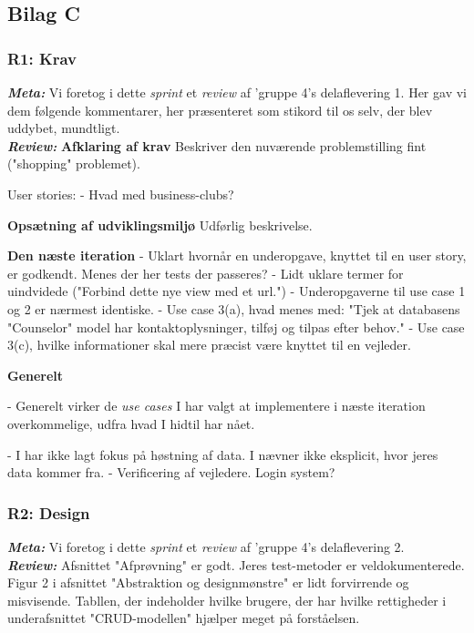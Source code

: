 \documentclass[12pt]{article}
\begin{document}
\subsection{Bilag C}
\label{sec:bilagC}
\subsubsection{R1: Krav}
\textit{\textbf{Meta:}} Vi foretog i dette \textit{sprint} et \textit{review} af 'gruppe 4's delaflevering 1. Her gav vi dem følgende kommentarer, her præsenteret som stikord til os selv, der blev uddybet, mundtligt. \\

\textit{\textbf{Review:}} \textbf{Afklaring af krav}
Beskriver den nuværende problemstilling fint ("shopping" problemet).

User stories:
- Hvad med business-clubs?

\textbf{Opsætning af udviklingsmiljø}
Udførlig beskrivelse.

\textbf{Den næste iteration}
- Uklart hvornår en underopgave, knyttet til en user story, er godkendt. Menes der her tests der passeres?
- Lidt uklare termer for uindvidede ("Forbind dette nye view med et url.")
- Underopgaverne til use case 1 og 2 er nærmest identiske.
- Use case 3(a), hvad menes med: "Tjek at databasens "Counselor" model har kontaktoplysninger, tilføj og tilpas efter behov."
- Use case 3(c), hvilke informationer skal mere præcist være knyttet til en vejleder.

\textbf{Generelt}

- Generelt virker de \textit{use cases} I har valgt at implementere i næste iteration overkommelige, udfra hvad I hidtil har nået.

- I har ikke lagt fokus på høstning af data. I nævner ikke eksplicit, hvor jeres data kommer fra.
- Verificering af vejledere. Login system?



\subsubsection{R2: Design}
\textit{\textbf{Meta:}} Vi foretog i dette \textit{sprint} et \textit{review} af 'gruppe 4's delaflevering 2.\\

\textit{\textbf{Review:}}
Afsnittet "Afprøvning" er godt. Jeres test-metoder er veldokumenterede.
Figur 2 i afsnittet "Abstraktion og designmønstre" er lidt forvirrende og misvisende.
Tabllen, der indeholder hvilke brugere, der har hvilke rettigheder i underafsnittet "CRUD-modellen" hjælper meget på forståelsen.
\end{document}

